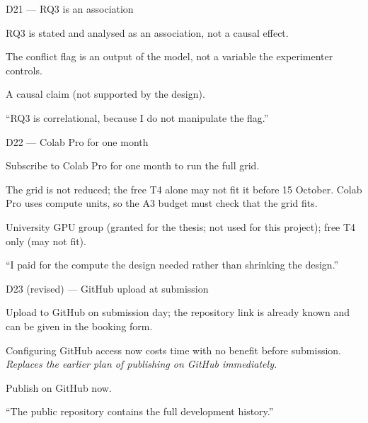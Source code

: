 \documentclass[11pt,a4paper]{report}
\begin{document}
\begin{decisionbox}{D21 --- RQ3 is an association}
\begin{description}[nosep, leftmargin=0pt]
  \item[Decision.] RQ3 is stated and analysed as an association, not a
    causal effect.
  \item[Why.] The conflict flag is an output of the model, not a variable
    the experimenter controls.
  \item[Alternatives.] A causal claim (not supported by the design).
  \item[Interview line.] ``RQ3 is correlational, because I do not
    manipulate the flag.''
\end{description}
\end{decisionbox}

\begin{decisionbox}{D22 --- Colab Pro for one month}
\begin{description}[nosep, leftmargin=0pt]
  \item[Decision.] Subscribe to Colab Pro for one month to run the full grid.
  \item[Why.] The grid is not reduced; the free T4 alone may not fit it
    before 15 October. Colab Pro uses compute units, so the A3 budget must
    check that the grid fits.
  \item[Alternatives.] University GPU group (granted for the thesis; not
    used for this project); free T4 only (may not fit).
  \item[Interview line.] ``I paid for the compute the design needed rather
    than shrinking the design.''
\end{description}
\end{decisionbox}

\begin{decisionbox}{D23 (revised) --- GitHub upload at submission}
\begin{description}[nosep, leftmargin=0pt]
  \item[Decision.] Upload to GitHub on submission day; the repository link
    is already known and can be given in the booking form.
  \item[Why.] Configuring GitHub access now costs time with no benefit
    before submission. \emph{Replaces the earlier plan of publishing on
    GitHub immediately.}
  \item[Alternatives.] Publish on GitHub now.
  \item[Interview line.] ``The public repository contains the full
    development history.''
\end{description}
\end{decisionbox}
\end{document}
